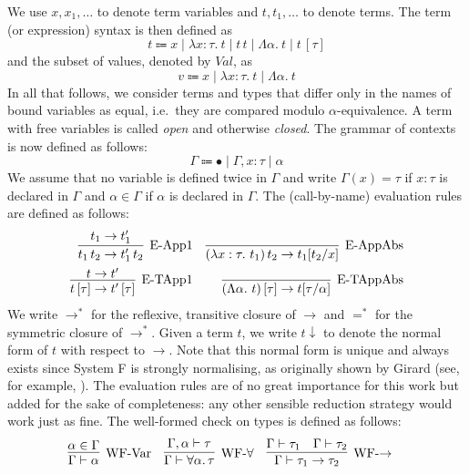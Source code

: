 \documentclass[12pt]{article}
\theoremstyle{plain}
\theoremstyle{definition}
\newcommand{\values}{Val}
\newcommand{\nf}[1]{#1{\downarrow}}
\newcommand{\eqnf}{=^*}
\begin{document}
We use $x,x_1,\dots$ to denote term variables and $t,t_1,\dots$ to denote terms.
The term (or expression) syntax is then defined as
\begin{equation*}
t \Coloneqq x \mid \lambda x : \tau.\ t \mid t\, t \mid \Lambda \alpha.\ t \mid  t\,[\tau]
\end{equation*}
and the subset of values, denoted by $\values$, as
\begin{equation*}
v \Coloneqq x\mid \lambda x : \tau.\ t \mid \Lambda \alpha.\ t
\end{equation*}
In all that follows, we consider terms and types that differ only in the names of bound variables as equal, i.e.\ they are compared modulo $\alpha$-equivalence.
A term with free variables is called \emph{open} and otherwise \emph{closed}.
The grammar of contexts is now defined as follows:
\begin{equation*}
\Gamma \Coloneqq \bullet \mid \Gamma, x : \tau \mid \alpha
\end{equation*}
We assume that no variable is defined twice in $\Gamma$ and write $\Gamma(x) = \tau$ if $x : \tau$ is declared in $\Gamma$ and $\alpha\in\Gamma$ if $\alpha$ is declared in $\Gamma$.
The (call-by-name) evaluation rules are defined as follows:
\begin{align*}
\infer[\text{E-App1}]{t_1\,t_2\to t_1'\,t_2}{t_1\to t_1'}&&
\infer[\text{E-AppAbs}]{(\lambda x : \tau.\ t_1)\, t_2\to t_1[t_2/x]}{}\\
\infer[\text{E-TApp1}]{t\,[\tau]\to t'\,[\tau]}{t\to t'}&&
\infer[\text{E-TAppAbs}]{(\Lambda \alpha.\ t)\, [\tau]\to t[\tau/\alpha]}{}
\end{align*}
We write $\to^*$ for the reflexive, transitive closure of $\to$
and $\eqnf$ for the symmetric closure of $\to^*$.
Given a term $t$, we write $\nf{t}$ to denote the normal form of $t$ with respect to $\to$.
Note that this normal form is unique and always exists
since System F is strongly normalising, as originally shown by Girard
(see, for example, \citep{girard1989proofs}).
The evaluation rules are of no great importance for this work
but added for the sake of completeness:
any other sensible reduction strategy would work just as fine.
The well-formed check on types is defined as follows:
\begin{align*}
&\infer[\text{WF-Var}]{\Gamma\vdash\alpha}{\alpha\in\Gamma}&&
  \infer[\text{WF-$\forall$}]{\Gamma\vdash\forall\alpha.\,\tau}{\Gamma,\alpha\vdash\tau}&&
  \infer[\text{WF-${\to}$}]{\Gamma\vdash\tau_1\to\tau_2}{\Gamma\vdash\tau_1&\Gamma\vdash\tau_2}
\end{align*}
\end{document}
